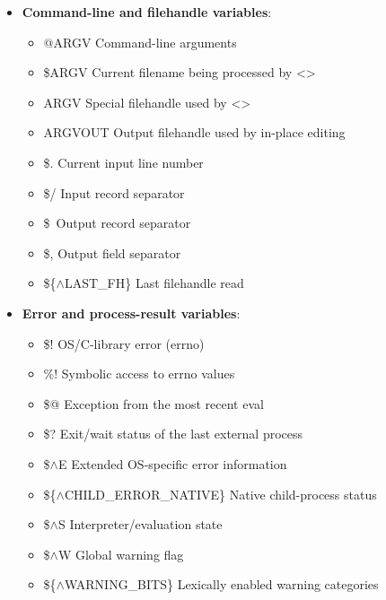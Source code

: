 \documentclass{report}
\begin{document}
\begin{itemize}
        \item \textbf{Command-line and filehandle variables}: 
            \begin{itemize}
                \item @ARGV	Command-line arguments
                \item \$ARGV	Current filename being processed by <>
                \item ARGV	Special filehandle used by <>
                \item ARGVOUT	Output filehandle used by in-place editing
                \item \$.	Current input line number
                \item \$/	Input record separator
                \item \$\	Output record separator
                \item \$,	Output field separator
                \item \$\{$\land$LAST\_FH\}	Last filehandle read
            \end{itemize}
        \item \textbf{Error and process-result variables}: 
            \begin{itemize}
                \item \$!	OS/C-library error (errno)
                \item \%!	Symbolic access to errno values
                \item \$@	Exception from the most recent eval
                \item \$?	Exit/wait status of the last external process
                \item \$$\land$E	Extended OS-specific error information
                \item \$\{$\land$CHILD\_ERROR\_NATIVE\}	Native child-process status
                \item \$$\land$S	Interpreter/evaluation state
                \item \$$\land$W	Global warning flag
                \item \$\{$\land$WARNING\_BITS\}	Lexically enabled warning categories
            \end{itemize}



    \end{itemize}
\end{document}
